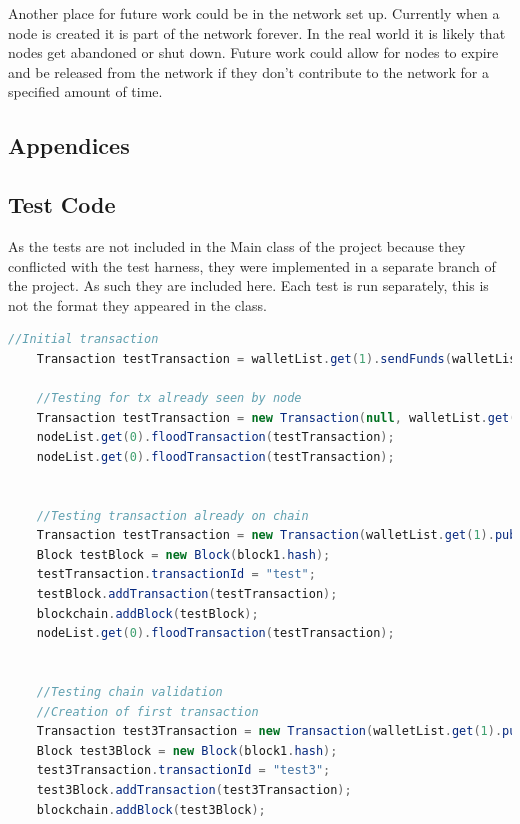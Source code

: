 \documentclass{l4proj}
\begin{document}
Another place for future work could be in the network set up. Currently when a node is created it is part of the
network forever. In the real world it is likely that nodes get abandoned or shut down. Future work could allow for 
nodes to expire and be released from the network if they don't contribute to the network for a specified amount of time.




\begin{appendices}

\chapter{Appendices}

\section{Test Code}
As the tests are not included in the Main class of the project because they conflicted with the test harness, they were implemented
in a separate branch of the project. As such they are included here. Each test is run separately, this is not the format they appeared
in the class.

\begin{lstlisting}[language=java, float=h
    , label=lst:testCode]
    //Initial transaction
    Transaction testTransaction = walletList.get(1).sendFunds(walletList.get(2).publicKey, 10);

    //Testing for tx already seen by node
    Transaction testTransaction = new Transaction(null, walletList.get(2).publicKey,10, null, blockchain);
    nodeList.get(0).floodTransaction(testTransaction);
    nodeList.get(0).floodTransaction(testTransaction);


    //Testing transaction already on chain
    Transaction testTransaction = new Transaction(walletList.get(1).publicKey, walletList.get(2).publicKey, 10, null, blockchain);
    Block testBlock = new Block(block1.hash);
    testTransaction.transactionId = "test";
    testBlock.addTransaction(testTransaction);
    blockchain.addBlock(testBlock);
    nodeList.get(0).floodTransaction(testTransaction);


    //Testing chain validation
    //Creation of first transaction
    Transaction test3Transaction = new Transaction(walletList.get(1).publicKey, walletList.get(2).publicKey, 10, null, blockchain);
    Block test3Block = new Block(block1.hash);
    test3Transaction.transactionId = "test3";
    test3Block.addTransaction(test3Transaction);
    blockchain.addBlock(test3Block);


\end{lstlisting}
\end{appendices}
\end{document}
